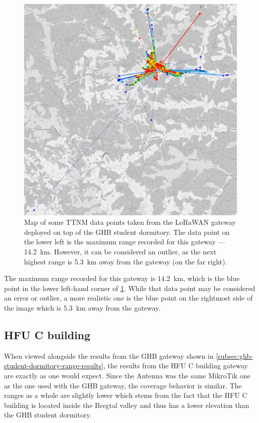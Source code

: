 \begin{figure}
    \centering
    \includegraphics[width=1\textwidth]{pictures/ttn-mapper/gateway-ranges/ghb_mikrotik_gw_range.png}
    \caption{
        Map of some \ac{TTNM} data points taken from the \ac{LoRaWAN} gateway deployed on top of the \ac{GHB} student dormitory.
        The data point on the lower left is the maximum range recorded for this gateway --- \SI{14.2}{\kilo\meter}.
        However, it can be considered an outlier, as the next highest range is \SI{5.3}{\kilo\meter} away from the gateway (on the far right).
    }\label{pic:ghb_mikrotik_gw_range}
\end{figure}

The maximum range recorded for this gateway is \SI{14.2}{\kilo\meter}, which is the blue point in the lower left-hand corner of \cref{pic:ghb_mikrotik_gw_range}.
While that data point may be considered an error or outlier, a more realistic one is the blue point on the rightmost side of the image which is \SI{5.3}{\kilo\meter} away from the gateway.

\subsection{\ac{HFU} C building}

When viewed alongside the results from the \ac{GHB} gateway shown in \cref{subsec:ghb-student-dormitory-range-results}, the results from the \ac{HFU} C building gateway are exactly as one would expect.
Since the Antenna was the same MikroTik one as the one used with the \ac{GHB} gateway, the coverage behavior is similar.
The ranges as a whole are slightly lower which stems from the fact that the \ac{HFU} C building is located inside the Bregtal valley and thus has a lower elevation than the \ac{GHB} student dormitory.

